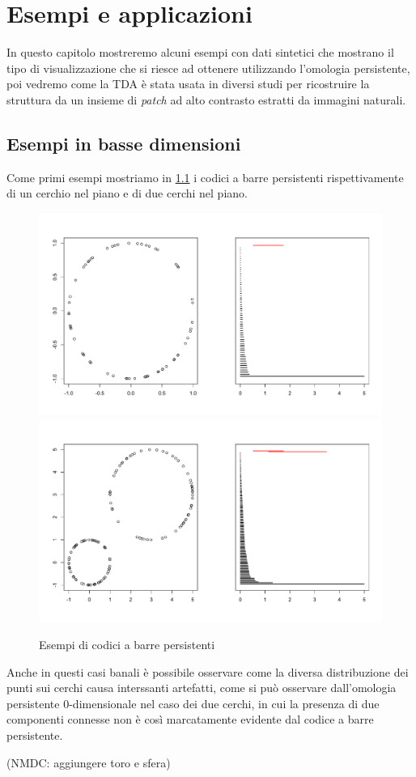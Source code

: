 \chapter{Esempi e applicazioni}\label{cap:esempi}

In questo capitolo mostreremo alcuni esempi con dati sintetici che mostrano il tipo di visualizzazione che si riesce ad ottenere utilizzando l'omologia persistente, poi vedremo come la TDA è stata usata in diversi studi per ricostruire la struttura da un insieme di \emph{patch} ad alto contrasto estratti da immagini naturali.

\section{Esempi in basse dimensioni}

Come primi esempi mostriamo in \cref{fig:examplecirclesbarcodes} i codici a barre persistenti rispettivamente di un cerchio nel piano e di due cerchi nel piano.

\begin{figure}[h]
  \caption{Esempi di codici a barre persistenti}
  \label{fig:examplecirclesbarcodes}
  \centering
  \includegraphics[width=.8\linewidth]{gfx/circle_persistence.pdf}
  \centering
  \includegraphics[width=.8\linewidth]{gfx/two_circles.pdf}
\end{figure}

Anche in questi casi banali è possibile osservare come la diversa distribuzione dei punti sui cerchi causa interssanti artefatti, come si può osservare dall'omologia persistente 0-dimensionale nel caso dei due cerchi, in cui la presenza di due componenti connesse non è così marcatamente evidente dal codice a barre persistente.

(NMDC: aggiungere toro e sfera)
